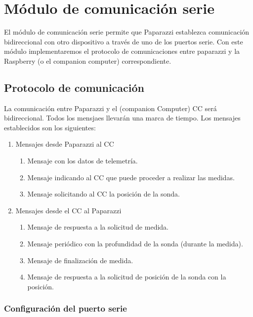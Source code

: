 \chapter{Módulo de comunicación serie}

El módulo de comunicación serie permite que Paparazzi establezca comunicación bidireccional con otro dispositivo a través de uno de los puertos serie. Con este módulo implementaremos el protocolo de comunicaciones entre paparazzi y la Raspberry (o el companion computer) correspondiente.

\section{Protocolo de comunicación}

La comunicación entre Paparazzi y el (companion Computer) CC será bidireccional. Todos los mensjaes llevarán una marca de tiempo. Los mensajes establecidos son los siguientes:
\begin{enumerate}
	\item Mensajes desde Paparazzi al CC
	\begin{enumerate}
		\item Mensaje con los datos de telemetría. 
		\item Mensaje indicando al CC que puede proceder a realizar las medidas.
		\item Mensaje solicitando al CC la posición de la sonda.
	\end{enumerate}
	\item Mensajes desde el CC al Paparazzi
	\begin{enumerate}
			\item Mensaje de respuesta a la solicitud de medida.
			\item Mensaje periódico con la profundidad de la sonda (durante la medida).
			\item Mensaje de finalización de medida.
			\item Mensaje de respuesta a la solicitud de posición de la sonda con la posición.
	\end{enumerate}	
\end{enumerate}

\subsection{Configuración del puerto serie}


